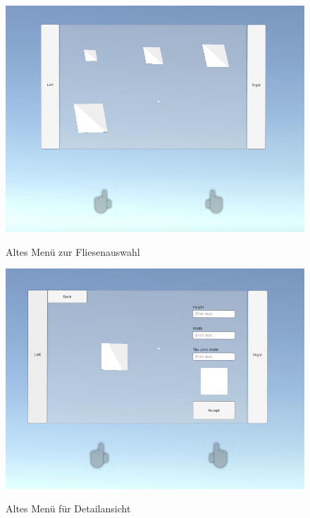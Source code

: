 \begin{figure}[h]
	\begin{center}
		\noindent\includegraphics[scale=0.50]{Resources/Artefakt/auswahlAlt.png}
		\label{fliesenwahlAlt}
		\caption{Altes Menü zur Fliesenauswahl}	
	\end{center}
\end{figure}

\begin{figure}[h]
	\begin{center}
		\noindent\includegraphics[scale=0.55]{Resources/Artefakt/detailAlt.png}
		\label{fliesendetailAlt}
		\caption{Altes Menü für Detailansicht}	
	\end{center}
\end{figure}

